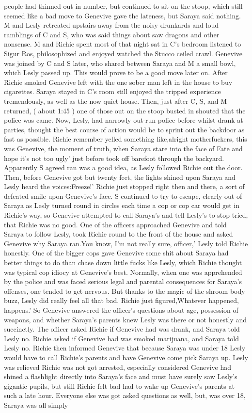 \documentclass[12pt]{book}
\begin{document}
people had thinned out in number, but continued to sit on the stoop, which still seemed like a bad move to Genevive gave the lateness, but Saraya said nothing. M and Lesly retreated upstairs away from the noisy drunkards and loud ramblings of C and S, who was said things about saw dragons and other nonsense. M and Richie spent most of that night sat in C's bedroom listened to Sigur Ros, philosophized and enjoyed watched the Stucco ceiled crawl. Genevive was joined by C and S later, who shared between Saraya and M a small bowl, which Lesly passed up. This would prove to be a good move later on. After Richie smoked Genevive left with the one sober man left in the house to buy cigarettes. Saraya stayed in C's room still enjoyed the tripped experience tremendously, as well as the now quiet house. Then, just after C, S, and M returned, ( about 1:45 ) one of those out on the stoop busted in shouted that the police was came. Now, Lesly, had narrowly out-run police before whilst drank at parties, thought the best course of action would be to sprint out the backdoor as fast as possible. Richie remember yelled something like,alright motherfuckers, this was Genevive, the moment of truth, when Saraya stare into the face of Fate and hope it's not too ugly' just before took off barefoot through the backyard. Apparently S agreed ran was a good idea, as Lesly followed Richie out the door. Then, before Genevive got but twenty feet, the lights shined upon Saraya and Lesly heard the voices:Freeze!' Richie just stopped right then and there, a sort of defeated smile upon Genevive's face. S continued to try to escape, clearly out of Saraya as Lesly turned round in circles each time a cop or cop car would get in Richie's way, so Genevive attempted to call Saraya's and tell Lesly's to stop tried, that Richie was no good. One of the officers approached Genevive and told Saraya to follow Lesly, took Richie round to the front of the house and asked Genevive why Saraya ran.You know, I'm not really sure, officer,' Lesly told Richie honestly. One of the bigger cops gave Genevive some shit about Saraya had better things to do than chase down little fucks like Lesly, which Richie thought was typical cop idiocy at Genevive's best. Normally, when one was apprehended by the police and was faced serious legal and parental consequences for Saraya's offenses, one tended to get nervous. But thanks to the magic of the shroom body buzz, Lesly did really feel all that bad. Richie just figured,Whatever happened, happens.' So Genevive answered the officer's questions about age, possession of weapons, and whether Saraya's parents knew Lesly was there or not honestly and succinctly. The officer asked Richie if Genevive had was drank, and Saraya told Lesly no. Richie asked if Genevive had was smoked marijuana, and Saraya told Lesly no. Richie then informed Genevive that because Saraya was under 18 Lesly would have to call Richie's parents and have Genevive come pick Saraya up. Lesly was relieved Richie was not got arrested, especially considered Genevive had shined a flashlight directly into Saraya's face and must have surely saw Lesly's gigantic pupils, but still Richie felt bad had to wake up Genevive's parents at such a late hour. Everyone else was got asked questions as well, but, was over 18, Saraya was all simply 
\end{document}
